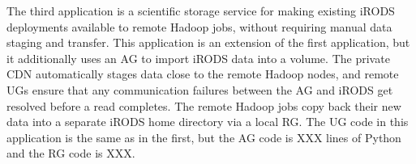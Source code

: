 The third application is a scientific storage service for making existing iRODS
deployments available to remote Hadoop jobs, without requiring manual data
staging and transfer. This application is an extension of the first application,
but it additionally uses an AG to import iRODS data into a volume. The private
CDN automatically stages data close to the remote Hadoop nodes, and remote UGs
ensure that any communication failures between the AG and iRODS get resolved
before a read completes. The remote Hadoop jobs copy back their new data into a
separate iRODS home directory via a local RG. The UG code in this application is
the same as in the first, but the AG code is XXX lines of Python and the RG
code is XXX.


